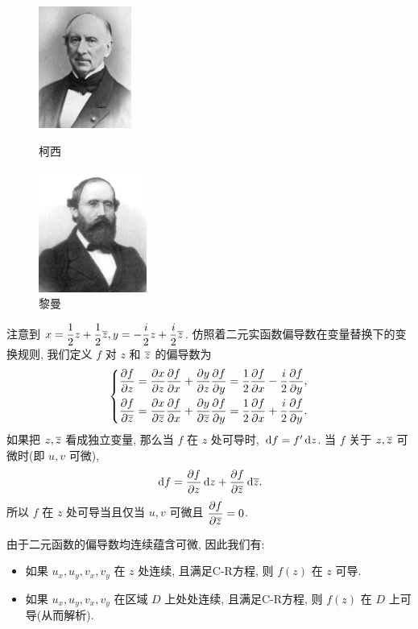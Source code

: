 \begin{figure}[htbp]
  \centering
  \begin{minipage}{.4\columnwidth}
    \centering
    \includegraphics[height=40mm]{../image/Cauchy.jpeg}
    \caption{柯西}
  \end{minipage}
  \qquad
  \begin{minipage}{.4\columnwidth}
    \centering
    \includegraphics[height=40mm]{../image/Riemann.jpeg}
    \caption{黎曼}
  \end{minipage}
\end{figure}

注意到 $x=\dfrac12z+\dfrac12\overline z,y=-\dfrac i2z+\dfrac i2\overline z$.
仿照着二元实函数偏导数在变量替换下的变换规则, 我们定义 $f$ 对 $z$ 和 $\overline z$ 的偏导数为
  \[\left\{\begin{aligned}
      \dfrac{\partial f}{\partial z}&
    =\dfrac{\partial x}{\partial z}\dfrac{\partial f}{\partial x}+\dfrac{\partial y}{\partial z}\dfrac{\partial f}{\partial y}
    =\frac12\dfrac{\partial f}{\partial x}-\frac i2\dfrac{\partial f}{\partial y},\\
      \dfrac{\partial f}{\partial \overline z}&
    =\dfrac{\partial x}{\partial \overline z}\dfrac{\partial f}{\partial x}+\dfrac{\partial y}{\partial \overline z}\dfrac{\partial f}{\partial y}
    =\frac12\dfrac{\partial f}{\partial x}+\frac i2\dfrac{\partial f}{\partial y}.
  \end{aligned}\right.\]
如果把 $z,\overline z$ 看成独立变量, 那么当 $f$ 在 $z$ 处可导时, $\,\mathrm{d} f=f'\,\mathrm{d} z$.
当 $f$ 关于 $z,\overline z$ 可微时(即 $u,v$ 可微),
  \[\,\mathrm{d} f=\dfrac{\partial f}{\partial z}\,\mathrm{d} z+\dfrac{\partial f}{\partial \overline z}\,\mathrm{d}\overline z.\]
所以 \alert{$f$ 在 $z$ 处可导当且仅当 $u,v$ 可微且 $\dfrac{\partial f}{\partial \overline z}=0$.}

由于二元函数的偏导数均连续蕴含可微, 因此我们有:

\begin{theorem}
	\begin{itemize}
		\item 如果 $u_x,u_y,v_x,v_y$ 在 $z$ 处连续, 且满足C-R方程, 则 $f(z)$ 在 $z$ 可导.
		\item 如果 $u_x,u_y,v_x,v_y$ 在区域 $D$ 上处处连续, 且满足C-R方程, 则 $f(z)$ 在 $D$ 上可导(从而解析).
	\end{itemize}
\end{theorem}


